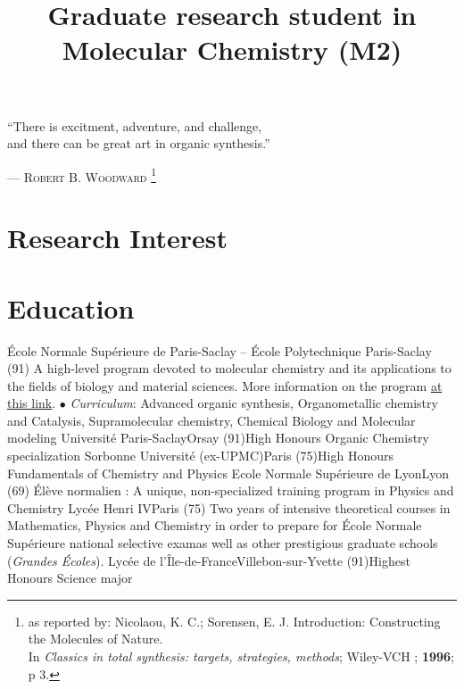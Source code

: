 \documentclass[11pt,a4paper,sans]{moderncv}
\title{Graduate research student in Molecular Chemistry (M2)}
\newcommand\Colorhref[3][cyan]{\href{#2}{\small\color{#1}#3}}
\begin{document}
\makecvtitle

{
    \vspace{-5mm}
    \centering
    \color{quote}
    \rmfamily
    ``There is excitment, adventure, and challenge,\\
    and there can be great art in organic synthesis.''\\
}

\begin{flushright}
    {\color{author}
    {---}  \textsc{Robert B. Woodward}
    \footnote{as reported by: Nicolaou, K. C.; Sorensen, E. J. Introduction: Constructing the Molecules of Nature. \\
    In \textit{Classics in total synthesis: targets, strategies, methods}; Wiley-VCH ; \textbf{1996}; p 3.
}}
\end{flushright}
%
%
%
\section{Research Interest}
%
%
%
\section{Education}
%
{{\newline}École Normale Supérieure de Paris-Saclay -- École Polytechnique}%
{Paris-Saclay (91)}{}%
{A high-level program devoted to molecular chemistry and its applications %
to the fields of biology and material sciences. %
More information on the program \Colorhref[red]{https://www.ip-paris.fr/master-2-molecular-chemistry-and-interfaces/}{at this link}. %
\medbreak
$\bullet$ \textit{Curriculum}: Advanced organic synthesis, Organometallic chemistry and Catalysis, %
Supramolecular chemistry, Chemical Biology and %
Molecular modeling%
}
\vspace{5mm}
%
%
%
{Université Paris-Saclay}{Orsay (91)}{High Honours}%
{Organic Chemistry specialization}
%
%
%
{Sorbonne Université (ex-UPMC)}{Paris (75)}{High Honours}%
{Fundamentals of Chemistry and Physics}
%
%
%
{Ecole Normale Supérieure de Lyon}{Lyon (69)}{}%
{Élève normalien : A unique, non-specialized training program in Physics and Chemistry}
%
%
%
{Lycée Henri IV}{Paris (75)}{}%
{Two years of intensive theoretical courses in Mathematics, Physics and Chemistry in order to prepare for École Normale Supérieure national selective examas well as other prestigious graduate schools (\emph{Grandes Écoles}).}
%
%
%
{Lycée de l'Île-de-France}{Villebon-sur-Yvette (91)}{Highest Honours}%
{Science major}
%
%
{\newpage}
%
%
%
\end{document}

